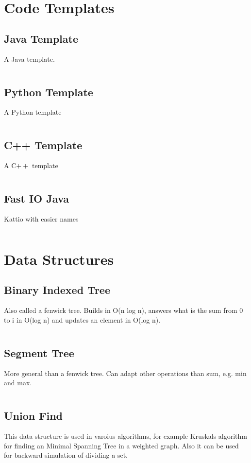 \documentclass[8pt,a4paper,landscape,oneside]{amsart}
\newcommand{\code}[1]{\inputminted[fontsize=\normalsize,baselinestretch=1]{cpp}{code/#1}}
\begin{document}
\begin{multicols*}{3}
\thispagestyle{fancy}
\vspace{-3em}

\tableofcontents
\section{Code Templates}
    \subsection{Java Template}
        A Java template.
        \code{template.java}
    \subsection{Python Template}
        A Python template
        \code{template.py}
    \subsection{C++ Template}
        A C$++$ template
        \code{template.cpp}
    \subsection{Fast IO Java}
        Kattio with easier names
        \code{fastio.java}

\section{Data Structures}
    \subsection{Binary Indexed Tree}
        Also called a fenwick tree. Builds in O(n log n), answers what is the sum from 0 to i in O(log n) and updates an element in O(log n).
        \code{DS/BIT.java}
    \subsection{Segment Tree}
        More general than a fenwick tree. Can adapt other operations than sum, e.g. min and max.
        \code{DS/ST.java}
    \subsection{Union Find}
        This data structure is used in varoius algorithms, for example Kruskals algorithm for finding an Minimal Spanning Tree in a weighted graph. Also it can be used for backward simulation of dividing a set.
        \code{DS/UF.java}
\end{multicols*}
\end{document}
